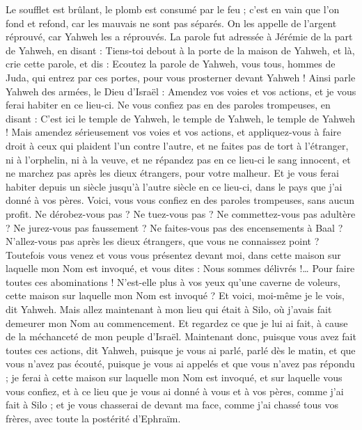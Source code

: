 \begin{multicols}{2}
Le soufflet est brûlant, le plomb est consumé par le feu ; c'est en vain que l'on fond et refond, car les mauvais ne sont pas séparés.
On les appelle de l'argent réprouvé, car Yahweh les a réprouvés.
\VerseOne{}La parole fut adressée à Jérémie de la part de Yahweh, en disant :
Tiens-toi debout à la porte de la maison de Yahweh, et là, crie cette parole, et dis : Ecoutez la parole de Yahweh, vous tous, hommes de Juda, qui entrez par ces portes, pour vous prosterner devant Yahweh !
Ainsi parle Yahweh des armées, le Dieu d'Israël : Amendez vos voies et vos actions, et je vous ferai habiter en ce lieu-ci.
Ne vous confiez pas en des paroles trompeuses, en disant : C'est ici le temple de Yahweh, le temple de Yahweh, le temple de Yahweh !
Mais amendez sérieusement vos voies et vos actions, et appliquez-vous à faire droit à ceux qui plaident l'un contre l'autre,
et ne faites pas de tort à l'étranger, ni à l'orphelin, ni à la veuve, et ne répandez pas en ce lieu-ci le sang innocent, et ne marchez pas après les dieux étrangers, pour votre malheur.
Et je vous ferai habiter depuis un siècle jusqu'à l'autre siècle en ce lieu-ci, dans le pays que j'ai donné à vos pères.
Voici, vous vous confiez en des paroles trompeuses, sans aucun profit.
Ne dérobez-vous pas ? Ne tuez-vous pas ? Ne commettez-vous pas adultère ? Ne jurez-vous pas faussement ? Ne faites-vous pas des encensements à Baal ? N'allez-vous pas après les dieux étrangers, que vous ne connaissez point ?
Toutefois vous venez et vous vous présentez devant moi, dans cette maison sur laquelle mon Nom est invoqué, et vous dites : Nous sommes délivrés !… Pour faire toutes ces abominations !
N'est-elle plus à vos yeux qu'une caverne de voleurs, cette maison sur laquelle mon Nom est invoqué ? Et voici, moi-même je le vois, dit Yahweh.
Mais allez maintenant à mon lieu qui était à Silo, où j'avais fait demeurer mon Nom au commencement. Et regardez ce que je lui ai fait, à cause de la méchanceté de mon peuple d'Israël.
Maintenant donc, puisque vous avez fait toutes ces actions, dit Yahweh, puisque je vous ai parlé, parlé dès le matin, et que vous n'avez pas écouté, puisque je vous ai appelés et que vous n'avez pas répondu ;
je ferai à cette maison sur laquelle mon Nom est invoqué, et sur laquelle vous vous confiez, et à ce lieu que je vous ai donné à vous et à vos pères, comme j'ai fait à Silo ;
et je vous chasserai de devant ma face, comme j'ai chassé tous vos frères, avec toute la postérité d'Ephraïm.

\end{multicols}

